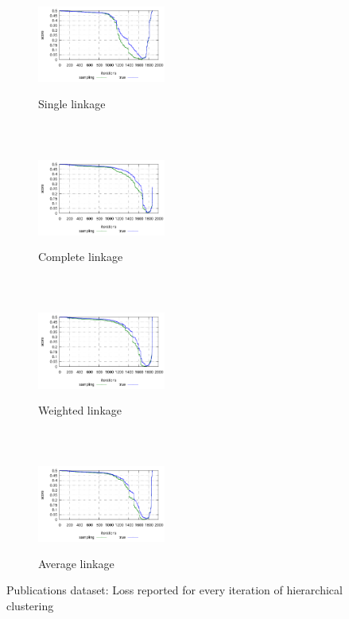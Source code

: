 \begin{figure}[t]
    \centering
    \begin{subfigure}[t]{0.22\textwidth}
        \centering
        \includegraphics[height=3.2cm, width=4.2cm,valign=t]{figures/plot_real_s.pdf}
        \caption{Single linkage}
    \end{subfigure}%
    ~ 
    \begin{subfigure}[t]{0.22\textwidth}
        \centering
        \includegraphics[height=3.2cm, width=4.2cm,valign=t]{figures/plot_real_c.pdf}
        \caption{Complete linkage}
    \end{subfigure}
	~
	\begin{subfigure}[t]{0.22\textwidth}
        \centering
        \includegraphics[height=3.2cm, width=4.2cm,valign=t]{figures/plot_real_w.pdf}
        \caption{Weighted linkage}
    \end{subfigure}
    ~
	\begin{subfigure}[t]{0.22\textwidth}
        \centering
        \includegraphics[height=3.2cm, width=4.2cm,valign=t]{figures/plot_real_a.pdf}
        \caption{Average linkage}
    \end{subfigure}
    
    \caption{Publications dataset: Loss reported for every iteration of hierarchical clustering}
    \label{fig:publications}
\end{figure}

